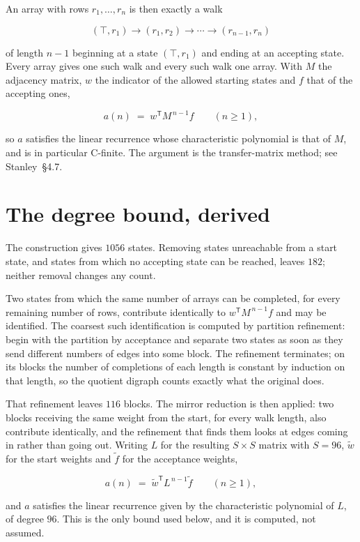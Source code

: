 \documentclass[11pt]{article}
\theoremstyle{definition}
\begin{document}
An array with rows $r_1,\dots,r_n$ is then exactly a walk

\[(\top,r_1) \to (r_1,r_2) \to \cdots \to (r_{n-1},r_n)\]

of length $n-1$ beginning at a state $(\top,r_1)$ and ending at an accepting state. Every array gives one such walk and every such walk one array. With $M$ the adjacency matrix, $w$ the indicator of the allowed starting states and $f$ that of the accepting ones,

\[a(n) \;=\; w^{\mathsf T} M^{\,n-1} f \qquad (n \ge 1),\]

so $a$ satisfies the linear recurrence whose characteristic polynomial is that of $M$, and is in particular C-finite. The argument is the transfer-matrix method; see Stanley~\S4.7.

\section{The degree bound, derived}

The construction gives $1056$ states. Removing states unreachable from a start state, and states from which no accepting state can be reached, leaves $182$; neither removal changes any count.

Two states from which the same number of arrays can be completed, for every remaining number of rows, contribute identically to $w^{\mathsf T}M^{\,n-1}f$ and may be identified. The coarsest such identification is computed by partition refinement: begin with the partition by acceptance and separate two states as soon as they send different numbers of edges into some block. The refinement terminates; on its blocks the number of completions of each length is constant by induction on that length, so the quotient digraph counts exactly what the original does.

That refinement leaves $116$ blocks. The mirror reduction is then applied: two blocks receiving the same weight from the start, for every walk length, also contribute identically, and the refinement that finds them looks at edges coming in rather than going out. Writing $L$ for the resulting $S \times S$ matrix with $S = 96$, $\tilde w$ for the start weights and $\tilde f$ for the acceptance weights,

\[a(n) \;=\; \tilde w^{\mathsf T} L^{\,n-1} \tilde f \qquad (n \ge 1),\]

and $a$ satisfies the linear recurrence given by the characteristic polynomial of $L$, of degree $96$. This is the only bound used below, and it is computed, not assumed.
\end{document}
